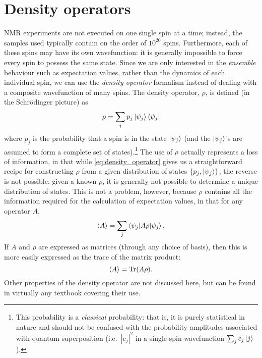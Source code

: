 \section{Density operators}
\label{sec:theory__density_operators}

NMR experiments are not executed on one single spin at a time; instead, the samples used typically contain on the order of $10^{20}$ spins.
Furthermore, each of these spins may have its own wavefunction: it is generally impossible to force every spin to possess the same state.
Since we are only interested in the \textit{ensemble} behaviour such as expectation values, rather than the dynamics of each individual spin, we can use the \textit{density operator} formalism instead of dealing with a composite wavefunction of many spins.
The density operator, $\rho$, is defined (in the Schr\"odinger picture) as
\begin{equation}
    \label{eq:density_operator}
    \rho = \sum_j p_j \ket{\psi_j}\bra{\psi_j}
\end{equation}
where $p_j$ is the probability that a spin is in the state $\ket{\psi_j}$ (and the $\ket{\psi_j}$'s are assumed to form a complete set of states).\footnote{This probability is a \textit{classical} probability: that is, it is purely statistical in nature and should not be confused with the probability amplitudes associated with quantum superposition (i.e.\ $|c_j|^2$ in a single-spin wavefunction $\sum_j c_j \ket{j}$).}
The use of $\rho$ actually represents a loss of information, in that while \cref{eq:density_operator} gives us a straightforward recipe for constructing $\rho$ from a given distribution of states $\{p_j, \ket{\psi_j}\}$, the reverse is not possible: given a known $\rho$, it is generally not possible to determine a unique distribution of states.
This is not a problem, however, because $\rho$ contains all the information required for the calculation of expectation values, in that for any operator $A$,
\begin{equation}
    \label{eq:density_expectation}
    \langle A \rangle = \sum_j \braket{\psi_j | A\rho | \psi_j}.
\end{equation}
If $A$ and $\rho$ are expressed as matrices (through any choice of basis), then this is more easily expressed as the trace of the matrix product:
\begin{equation}
    \label{eq:density_trace}
    \langle A \rangle = \operatorname{Tr}(A\rho).
\end{equation}
Other properties of the density operator are not discussed here, but can be found in virtually any textbook covering their use.\autocite{Blum2012,CohenTannoudji2020,Sakurai2021}


